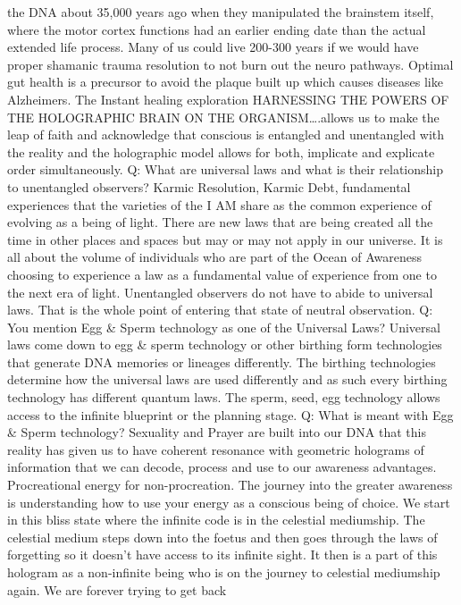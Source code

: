 the DNA about 35,000 years ago when they manipulated the brainstem
itself, where the motor cortex functions had an earlier ending date than
the actual extended life process. Many of us could live 200-300 years if
we would have proper shamanic trauma resolution to not burn out the
neuro pathways. Optimal gut health is a precursor to avoid the plaque
built up which causes diseases like Alzheimers. The Instant healing
exploration HARNESSING THE POWERS OF THE HOLOGRAPHIC BRAIN ON THE
ORGANISM\ldots{}.allows us to make the leap of faith and acknowledge
that conscious is entangled and unentangled with the reality and the
holographic model allows for both, implicate and explicate order
simultaneously. Q: What are universal laws and what is their
relationship to unentangled observers? Karmic Resolution, Karmic Debt,
fundamental experiences that the varieties of the I AM share as the
common experience of evolving as a being of light. There are new laws
that are being created all the time in other places and spaces but may
or may not apply in our universe. It is all about the volume of
individuals who are part of the Ocean of Awareness choosing to
experience a law as a fundamental value of experience from one to the
next era of light. Unentangled observers do not have to abide to
universal laws. That is the whole point of entering that state of
neutral observation. Q: You mention Egg \& Sperm technology as one of
the Universal Laws? Universal laws come down to egg \& sperm technology
or other birthing form technologies that generate DNA memories or
lineages differently. The birthing technologies determine how the
universal laws are used differently and as such every birthing
technology has different quantum laws. The sperm, seed, egg technology
allows access to the infinite blueprint or the planning stage. Q: What
is meant with Egg \& Sperm technology? Sexuality and Prayer are built
into our DNA that this reality has given us to have coherent resonance
with geometric holograms of information that we can decode, process and
use to our awareness advantages. Procreational energy for
non-procreation. The journey into the greater awareness is understanding
how to use your energy as a conscious being of choice. We start in this
bliss state where the infinite code is in the celestial mediumship. The
celestial medium steps down into the foetus and then goes through the
laws of forgetting so it doesn't have access to its infinite sight. It
then is a part of this hologram as a non-infinite being who is on the
journey to celestial mediumship again. We are forever trying to get back
